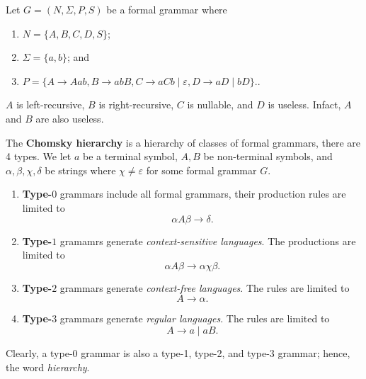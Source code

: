 \begin{example}
    Let $G = (N, \Sigma, P, S)$ be a formal grammar where
    \begin{enumerate}
        \item $N = \{A, B, C, D, S\}$;
        \item $\Sigma = \{a, b\}$; and
        \item 
            $
                P = 
                \{
                    A \to Aab,
                    B \to abB,
                    C \to aCb \mid \varepsilon,
                    D \to aD \mid bD
                \}.
            $.
    \end{enumerate}
    $A$ is left-recursive, $B$ is right-recursive,
    $C$ is nullable, and $D$ is useless. Infact, $A$ and $B$
    are also useless.
\end{example}

\begin{definition}
    The \textbf{Chomsky hierarchy} is a hierarchy of classes
    of formal grammars, there are 4 types.
    We let $a$ be a terminal symbol, $A, B$ be non-terminal symbols, and
    $\alpha, \beta, \chi, \delta$ be strings where $\chi \neq \varepsilon$
    for some formal grammar $G$.

    \begin{enumerate}
        \item 
            \textbf{Type-$0$} grammars include all formal grammars, their
            production rules are limited to
            \[ \alpha A \beta \to \delta. \]
        
        \item
            \textbf{Type-$1$} gramamrs generate \emph{context-sensitive languages}.
            The productions are limited to
            \[ \alpha A \beta \to \alpha\chi\beta. \]
    
        \item
            \textbf{Type-$2$} grammars generate \emph{context-free languages}.
            The rules are limited to
            \[ A \to \alpha. \]

        \item
            \textbf{Type-$3$} grammars generate \emph{regular languages}.
            The rules are limited to
            \[ A \to a \mid aB. \]
    \end{enumerate}
\end{definition}

\begin{remark}
    Clearly, a type-0 grammar is also a type-1, type-2, and type-3 grammar;
    hence, the word \emph{hierarchy}.
\end{remark}


